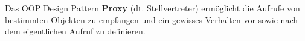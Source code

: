 Das OOP Design Pattern \textbf{Proxy} (dt. Stellvertreter) ermöglicht die Aufrufe von bestimmten Objekten 
zu empfangen und ein gewisses Verhalten vor sowie nach dem eigentlichen Aufruf zu definieren.